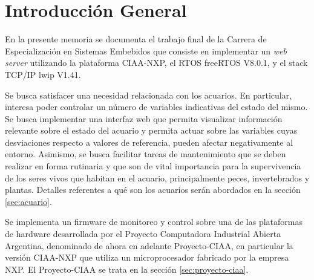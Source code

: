 
\chapter{Introducción General} %

\label{Chapter1} %
\label{IntroGeneral}


\newcommand{\keyword}[1]{\textbf{#1}}
\newcommand{\tabhead}[1]{\textbf{#1}}
\newcommand{\code}[1]{\texttt{#1}}
\newcommand{\file}[1]{\texttt{\bfseries#1}}
\newcommand{\option}[1]{\texttt{\itshape#1}}



En la presente memoria se documenta el trabajo final de la Carrera de Especialización en Sistemas Embebidos que consiste en implementar un \textit{web server} utilizando la plataforma CIAA-NXP, el RTOS freeRTOS V8.0.1, y el stack TCP/IP lwip V1.41. 

Se busca satisfacer una necesidad relacionada con los acuarios. En particular, interesa poder controlar un número de variables indicativas del estado del mismo.  Se busca implementar una interfaz web que permita visualizar información relevante sobre el estado del acuario y permita actuar sobre las variables cuyas desviaciones respecto a valores de referencia, pueden afectar negativamente al entorno.  Asimismo, se busca facilitar tareas de mantenimiento que se deben realizar en forma rutinaria y que son de vital importancia para la supervivencia de los seres vivos que habitan en el acuario, principalmente peces, invertebrados y plantas. Detalles referentes a qué son los acuarios serán abordados en la sección \ref{sec:acuario}.

Se implementa un firmware de monitoreo y control sobre una de las plataformas de hardware desarrollada por el Proyecto Computadora Industrial Abierta Argentina, denominado de ahora en adelante Proyecto-CIAA, en particular la versión CIAA-NXP que utiliza un microprocesador fabricado por la empresa NXP. El Proyecto-CIAA se trata en la sección \ref{sec:proyecto-ciaa}.

